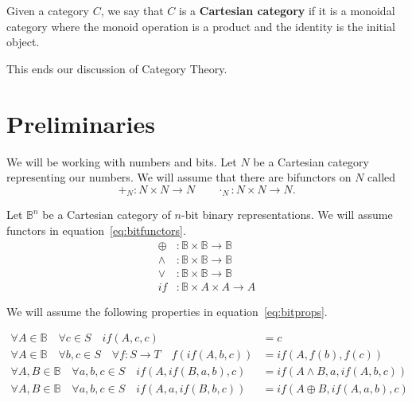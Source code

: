 \documentclass[14pt]{extarticle}  %
\newcommand{\atticus}[1]{\textbf{AK: #1}}
\begin{document}
\begin{defn}
\begin{defn}
  Given a category $C$, we say that $C$ is a \textbf{Cartesian category} if it is a monoidal category where the monoid operation is a product and the identity is the initial object.
\end{defn}

This ends our discussion of Category Theory.


\end{defn}
\section{Preliminaries}
We will be working with numbers and bits.
Let $N$ be a Cartesian category representing our numbers. We will assume that there are bifunctors on $N$ called
\[+_{N} : N \times N \to N \qquad \cdot_{N} : N \times N \to N.\]

Let $\mathbb{B}^{n}$ be a Cartesian category of $n$-bit binary representations. We will assume functors in equation~\ref{eq:bitfunctors}.
\begin{align}\label{eq:bitfunctors}
  \oplus &: \mathbb{B} \times \mathbb{B} \to \mathbb{B} \\
  \land &: \mathbb{B} \times \mathbb{B} \to \mathbb{B} \\
  \lor &: \mathbb{B} \times \mathbb{B} \to \mathbb{B} \\
  if &: \mathbb{B} \times A \times A \to A
\end{align}

We will assume the following properties in equation~\ref{eq:bitprops}. %

\begin{align}\label{eq:bitprops}
  \forall A \in \mathbb{B} \quad \forall c \in S \quad if(A,c,c)  &= c \\
  \forall A \in \mathbb{B} \quad \forall b,c \in S \quad \forall f : S \to T \quad  f(if(A,b,c)) &= if(A,f(b), f(c)) \\
  \forall A, B \in \mathbb{B} \quad \forall a,b,c \in S \quad if(A, if(B, a,b),c) &= if(A \land B, a, if(A, b,c)) \\
  \forall A, B \in \mathbb{B} \quad \forall a,b,c \in S \quad if(A, a, if(B,b,c)) &= if(A \oplus B, if(A , a , b), c )
\end{align}
\end{document}
